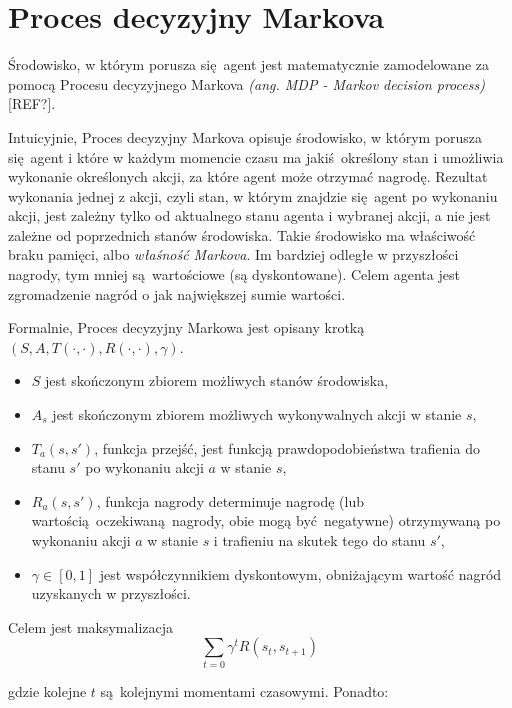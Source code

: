 \section{Proces decyzyjny Markova}\label{mdp}

Środowisko, w którym porusza się agent jest matematycznie zamodelowane za pomocą Procesu decyzyjnego Markova \textit{(ang. MDP - Markov decision process)} [REF?].

Intuicyjnie, Proces decyzyjny Markova opisuje środowisko, w którym porusza się agent i które w każdym momencie czasu ma jakiś określony stan i umożliwia wykonanie określonych akcji, za które agent może otrzymać nagrodę. Rezultat wykonania jednej z akcji, czyli stan, w którym znajdzie się agent po wykonaniu akcji, jest zależny tylko od aktualnego stanu agenta i wybranej akcji, a nie jest zależne od poprzednich stanów środowiska. Takie środowisko ma właściwość braku pamięci, albo \textit{właśność Markova}. Im bardziej odległe w przyszłości nagrody, tym mniej są wartościowe (są dyskontowane). Celem agenta jest zgromadzenie nagród o jak największej sumie wartości.

\vspace{5mm}

Formalnie, Proces decyzyjny Markowa jest opisany krotką $(S,A,T(\cdot,\cdot),R(\cdot,\cdot),\gamma)$.
\begin{itemize}
\item $S$ jest skończonym zbiorem możliwych stanów środowiska,
\item $A_s$ jest skończonym zbiorem możliwych wykonywalnych akcji w stanie $s$,
\item $T_a(s,s')$, funkcja przejść, jest funkcją prawdopodobieństwa trafienia do stanu $s'$ po wykonaniu akcji $a$ w stanie $s$,
\item $R_a(s,s')$, funkcja nagrody determinuje nagrodę (lub wartością oczekiwaną nagrody, obie mogą być negatywne) otrzymywaną po wykonaniu akcji $a$ w stanie $s$ i trafieniu na skutek tego do stanu $s'$,
\item $\gamma \in [0,1]$ jest współczynnikiem dyskontowym, obniżającym wartość nagród uzyskanych w przyszłości.
\end{itemize}

Celem jest maksymalizacja $$\sum_{t=0}{\gamma^t R(s_t,s_{t+1})}$$

gdzie kolejne $t$ są kolejnymi momentami czasowymi. Ponadto:

